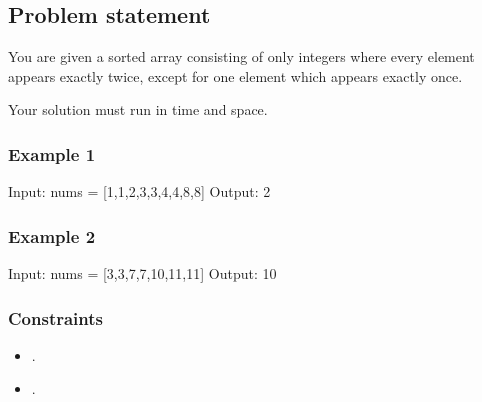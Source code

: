 \documentclass[letterpaper,12pt,english]{book}
\begin{document}
\subsection{Problem statement\sphinxfootnotemark[91]}
\label{\detokenize{Binary_Search/540_Single_Element_in_a_Sorted_Array:problem-statement}}%
\begin{footnotetext}[91]\sphinxAtStartFootnote
{}
%
\end{footnotetext}\ignorespaces 
\sphinxAtStartPar
You are given a sorted array consisting of only integers where every element appears exactly twice, except for one element which appears exactly once.

\sphinxAtStartPar
{}

\sphinxAtStartPar
Your solution must run in  time and  space.


\subsubsection{Example 1}
\label{\detokenize{Binary_Search/540_Single_Element_in_a_Sorted_Array:example-1}}
\begin{sphinxVerbatim}[commandchars=\\\{\}]
Input: nums = [1,1,2,3,3,4,4,8,8]
Output: 2
\end{sphinxVerbatim}


\subsubsection{Example 2}
\label{\detokenize{Binary_Search/540_Single_Element_in_a_Sorted_Array:example-2}}
\begin{sphinxVerbatim}[commandchars=\\\{\}]
Input: nums = [3,3,7,7,10,11,11]
Output: 10
\end{sphinxVerbatim}


\subsubsection{Constraints}
\label{\detokenize{Binary_Search/540_Single_Element_in_a_Sorted_Array:constraints}}\begin{itemize}
\item {} 
\sphinxAtStartPar
{}.

\item {} 
\sphinxAtStartPar
{}.

\end{itemize}
\end{document}
